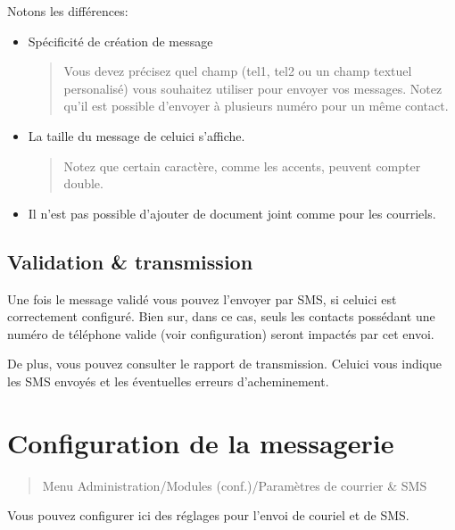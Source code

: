 \documentclass[a4paper,10pt,oneside,french]{sphinxmanual}
\begin{document}
Notons les différences:
\begin{itemize}
\item {} 
Spécificité de création de message
\begin{quote}

Vous devez précisez quel champ (tel1, tel2 ou un champ textuel personalisé) vous souhaitez utiliser pour envoyer vos messages.
Notez qu’il est possible d’envoyer à plusieurs numéro pour un même contact.
\end{quote}

\item {} 
La taille du message de celui\sphinxhyphen{}ci s’affiche.
\begin{quote}

Notez que certain caractère, comme les accents, peuvent compter double.
\end{quote}

\item {} 
Il n’est pas possible d’ajouter de document joint comme pour les courriels.

\end{itemize}


\subsection{Validation \& transmission}
\label{\detokenize{mailing/sms:validation-transmission}}
Une fois le message validé vous pouvez l’envoyer par SMS, si celui\sphinxhyphen{}ci est correctement configuré.
Bien sur, dans ce cas, seuls les contacts possédant une numéro de téléphone valide (voir configuration) seront impactés par cet envoi.

De plus, vous pouvez consulter le rapport de transmission.
Celui\sphinxhyphen{}ci vous indique les SMS envoyés et les éventuelles erreurs d’acheminement.


\section{Configuration de la messagerie}
\label{\detokenize{mailing/configuration:configuration-de-la-messagerie}}\label{\detokenize{mailing/configuration::doc}}\begin{quote}

Menu Administration/Modules (conf.)/Paramètres de courrier \& SMS
\end{quote}

Vous pouvez configurer ici des réglages pour l’envoi de couriel et de SMS.
\end{document}

